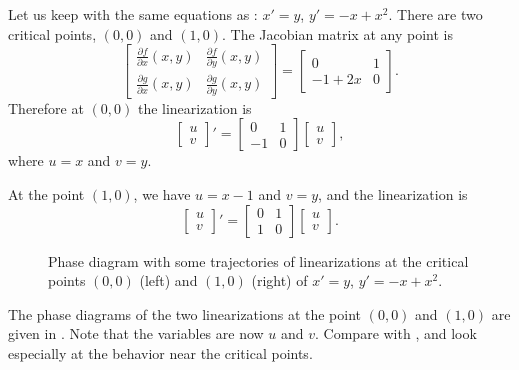 \documentclass[12pt]{book}
\begin{document}
\begin{example} \label{example:nlin-1b-examplelin}
Let us keep with the same equations as :
$x' = y$, $y' = -x+x^2$.  There are two critical points, $(0,0)$
and $(1,0)$.  The Jacobian matrix at any point is
\begin{equation*}
\begin{bmatrix}
\frac{\partial f}{\partial x}(x,y) &
\frac{\partial f}{\partial y}(x,y) \\
\frac{\partial g}{\partial x}(x,y) &
\frac{\partial g}{\partial y}(x,y)
\end{bmatrix} =
\begin{bmatrix}
0 & 1 \\
-1+2x & 0
\end{bmatrix}.
\end{equation*}
Therefore at $(0,0)$ the linearization is
\begin{equation*}
\begin{bmatrix} u \\ v \end{bmatrix} ' =
\begin{bmatrix}
0 & 1 \\
-1 & 0
\end{bmatrix}
\begin{bmatrix} u \\ v \end{bmatrix} ,
\end{equation*}
where $u=x$ and $v=y$.

At the point $(1,0)$, we have $u=x-1$ and $v=y$, and the linearization is
\begin{equation*}
\begin{bmatrix} u \\ v \end{bmatrix} ' =
\begin{bmatrix}
0 & 1 \\
1 & 0
\end{bmatrix}
\begin{bmatrix} u \\ v \end{bmatrix} .
\end{equation*}

\begin{figure}[h!t]
\capstart
\begin{center}
\caption{Phase diagram with some trajectories of
linearizations at the critical points $(0,0)$ (left) and $(1,0)$ (right) of
$x' = y$, $y' = -x+x^2$. \label{fig:nlin-1b-lin}}
\end{center}
\end{figure}

The phase diagrams of the two linearizations at the
point $(0,0)$ and $(1,0)$ are given in .  Note
that the variables are now $u$ and $v$.  Compare
 with , and look especially at the
behavior near the critical points.
\end{example}
\end{document}
